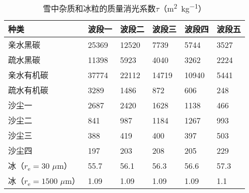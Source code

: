 \begin{table}[htbp]
  \centering
  \caption{雪中杂质和冰粒的质量消光系数$\tau$（\unit{m^{2}.kg^{-1}}） }
  \label{tab:积雪消光系数}
  \begin{tabular}{llllll}
    \toprule
    种类                                       & 波段一 & 波段二 & 波段三 & 波段四 & 波段五 \\ \midrule
    亲水黑碳                                   & 25369  & 12520  & 7739   & 5744   & 3527   \\
    疏水黑碳                                   & 11398  & 5923   & 4040   & 3262   & 2224   \\
    亲水有机碳                                 & 37774  & 22112  & 14719  & 10940  & 5441   \\
    疏水有机碳                                 & 3289   & 1486   & 872    & 606    & 248    \\
    沙尘一                                     & 2687   & 2420   & 1628   & 1138   & 466    \\
    沙尘二                                     & 841    & 987    & 1184   & 1267   & 993    \\
    沙尘三                                     & 388    & 419    & 400    & 397    & 503    \\
    沙尘四                                     & 197    & 203    & 208    & 205    & 229    \\
    冰（$r_{\mathrm e}=30$ $\mu\mathrm{m}$）   & 55.7   & 56.1   & 56.3   & 56.6   & 57.3   \\
    冰（$r_{\mathrm e}=1500$ $\mu\mathrm{m}$） & 1.09   & 1.09   & 1.09   & 1.09   & 1.1    \\ \bottomrule
  \end{tabular}
\end{table}

